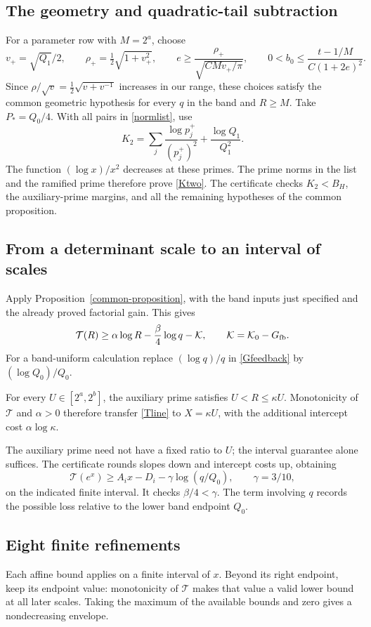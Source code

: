 \documentclass[11pt]{article}
\newcommand{\Tn}{\mathcal T}
\begin{document}
\subsection{The geometry and quadratic-tail subtraction}\label{band-inputs}
For a parameter row with \(M=2^a\), choose
\[
 v_+=\sqrt{Q_1}/2,\qquad \rho_+=\tfrac12\sqrt{1+v_+^2},\qquad
 e\ge\frac{\rho_+}{\sqrt{CMv_+/\pi}},\qquad
 0<b_0\le\frac{t-1/M}{C(1+2e)^2}.
\]
Since \(\rho/\sqrt v=\tfrac12\sqrt{v+v^{-1}}\) increases in
our range, these choices satisfy the common geometric hypothesis for
every \(q\) in the band and \(R\ge M\). Take \(P_*=Q_0/4\).
With all pairs in \eqref{normlist}, use
\begin{equation}\label{band-Ktwo}
 K_2=\sum_j\frac{\log p_j^+}{(p_j^+)^2}
             +\frac{\log Q_1}{Q_1^2}.
\end{equation}
The function \((\log x)/x^2\) decreases at these primes. The prime
norms in the list and the ramified prime therefore prove
\eqref{Ktwo}. The certificate checks \(K_2<B_H\), the auxiliary-prime
margins, and all the remaining hypotheses of the common proposition.

\subsection{From a determinant scale to an interval of scales}
Apply Proposition~\ref{common-proposition}, with the band inputs
just specified and the already proved factorial gain. This gives
\begin{equation}\label{Tline}
 \Tn(R)\ge\alpha\log R-\frac\beta4\log q-\mathcal K,
 \qquad \mathcal K=\mathcal K_0-G_{\rm fb}.
\end{equation}
For a band-uniform calculation replace \((\log q)/q\) in
\eqref{Gfeedback} by \((\log Q_0)/Q_0\).

For every \(U\in[2^a,2^b]\), the auxiliary prime satisfies
\(U<R\le\kappa U\). Monotonicity of \(\Tn\) and \(\alpha>0\)
therefore transfer \eqref{Tline} to \(X=\kappa U\), with the
additional intercept cost \(\alpha\log\kappa\).

The auxiliary prime need not have a fixed ratio to \(U\); the interval
guarantee alone suffices. The certificate rounds slopes down and
intercept costs up, obtaining
\[
 \Tn(e^x)\ge A_i x-D_i-\gamma\log(q/Q_0),\qquad
 \gamma=3/10,
\]
on the indicated finite interval. It checks \(\beta/4<\gamma\).
The term involving \(q\) records the possible loss relative to the
lower band endpoint \(Q_0\).

\subsection{Eight finite refinements}
Each affine bound applies on a finite interval of \(x\). Beyond its
right endpoint, keep its endpoint value: monotonicity of \(\Tn\)
makes that value a valid lower bound at all later scales. Taking the
maximum of the available bounds and zero gives a nondecreasing
envelope.
\end{document}
